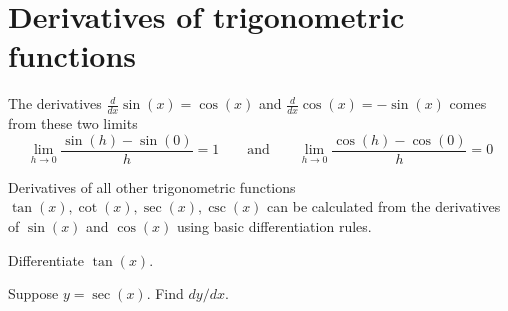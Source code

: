 \documentclass[../main.tex]{subfiles}
\begin{document}
 \section{Derivatives of trigonometric functions}
The derivatives \(\frac{d}{dx}\sin(x) = \cos(x)\) and \(\frac{d}{dx} \cos(x) = -\sin(x)\) comes from these two limits
\begin{equation} \label{eq:limits-trigs}
  \lim_{h \to 0} \frac{\sin(h) - \sin(0)}{h} = 1
  \qquad\text{and}\qquad
  \lim_{h \to 0} \frac{\cos(h) - \cos(0)}{h} = 0
\end{equation}
\begin{center}
  
  \qquad
  
\end{center}


Derivatives of all other trigonometric functions \(\tan(x), \cot(x), \sec(x), \csc(x)\) can be calculated from the derivatives of \(\sin(x)\) and \(\cos(x)\) using basic differentiation rules.
\begin{example}
  Differentiate \(\tan(x)\).

\end{example}

\begin{example}
  Suppose \(y = \sec(x)\). Find \(dy/dx\). 

\end{example}
\end{document}
